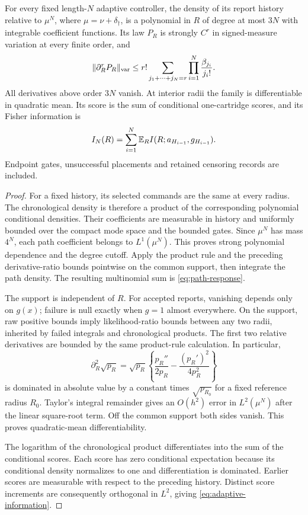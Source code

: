 \begin{theorem}\label{thm:response}
For every fixed length-$N$ adaptive controller, the density of its report history relative to $\mu^N$, where $\mu=\nu+\delta_\dagger$, is a polynomial in $R$ of degree at most $3N$ with integrable coefficient functions. Its law $P_R$ is strongly $C^r$ in signed-measure variation at every finite order, and
\begin{equation}
 \|\partial_R^rP_R\|_{\rm var}
 \le r!\sum_{j_1+\cdots+j_N=r}\prod_{i=1}^N\frac{\beta_{j_i}}{j_i!}.
 \label{eq:path-response}
\end{equation}
All derivatives above order $3N$ vanish. At interior radii the family is differentiable in quadratic mean. Its score is the sum of conditional one-cartridge scores, and its Fisher information is
\begin{equation}
 I_N(R)=\sum_{i=1}^N\mathbb E_R I(R;a_{H_{i-1}},g_{H_{i-1}}).
 \label{eq:adaptive-information}
\end{equation}
Endpoint gates, unsuccessful placements and retained censoring records are included.
\end{theorem}
\begin{proof}
For a fixed history, its selected commands are the same at every radius. The chronological density is therefore a product of the corresponding polynomial conditional densities. Their coefficients are measurable in history and uniformly bounded over the compact mode space and the bounded gates. Since $\mu^N$ has mass $4^N$, each path coefficient belongs to $L^1(\mu^N)$. This proves strong polynomial dependence and the degree cutoff. Apply the product rule and the preceding derivative-ratio bounds pointwise on the common support, then integrate the path density. The resulting multinomial sum is \eqref{eq:path-response}.

The support is independent of $R$. For accepted reports, vanishing depends only on $g(x)$; failure is null exactly when $g=1$ almost everywhere. On the support, raw positive bounds imply likelihood-ratio bounds between any two radii, inherited by failed integrals and chronological products. The first two relative derivatives are bounded by the same product-rule calculation. In particular,
\[
 \partial_R^2\sqrt{p_R}=\sqrt{p_R}
 \left\{\frac{p_R''}{2p_R}-\frac{(p_R')^2}{4p_R^2}\right\}
\]
is dominated in absolute value by a constant times $\sqrt{p_{R_0}}$ for a fixed reference radius $R_0$. Taylor's integral remainder gives an $O(h^2)$ error in $L^2(\mu^N)$ after the linear square-root term. Off the common support both sides vanish. This proves quadratic-mean differentiability.

The logarithm of the chronological product differentiates into the sum of the conditional scores. Each score has zero conditional expectation because its conditional density normalizes to one and differentiation is dominated. Earlier scores are measurable with respect to the preceding history. Distinct score increments are consequently orthogonal in $L^2$, giving \eqref{eq:adaptive-information}.
\end{proof}


